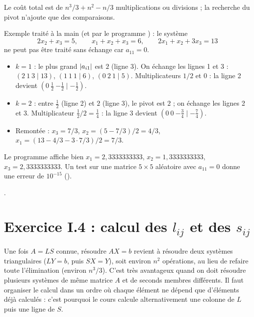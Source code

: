 Le coût total est de $n^3/3 + n^2 - n/3$ multiplications ou divisions
 ; la recherche du pivot n'ajoute que des comparaisons.

\Verif Exemple traité à la main (et par le programme ) :
le système
\[
  2x_2 + x_3 = 5, \qquad x_1 + x_2 + x_3 = 6, \qquad 2x_1 + x_2 + 3x_3 = 13
\]
ne peut pas être traité sans échange car $a_{11} = 0$.
\begin{itemize}
  \item $k = 1$ : le plus grand $\left|a_{i1}\right|$ est $2$ (ligne 3). On échange
        les lignes 1 et 3 : $(2\ 1\ 3 \mid 13)$, $(1\ 1\ 1 \mid 6)$,
        $(0\ 2\ 1 \mid 5)$. Multiplicateurs $1/2$ et $0$ : la ligne 2 devient
        $(0\ \tfrac12\ {-\tfrac12} \mid -\tfrac12)$.
  \item $k = 2$ : entre $\tfrac12$ (ligne 2) et $2$ (ligne 3), le pivot est
        $2$ ; on échange les lignes 2 et 3. Multiplicateur
        $\tfrac12/2 = \tfrac14$ : la ligne 3 devient
        $(0\ 0\ {-\tfrac34} \mid -\tfrac74)$.
  \item Remontée : $x_3 = 7/3$, $x_2 = (5 - 7/3)/2 = 4/3$,
        $x_1 = (13 - 4/3 - 3\cdot 7/3)/2 = 7/3$.
\end{itemize}
Le programme affiche bien $x_1 = 2{,}3333333333$, $x_2 = 1{,}3333333333$,
$x_3 = 2{,}3333333333$. Un test sur une matrice $5\times 5$ aléatoire avec
$a_{11} = 0$ donne une erreur de $10^{-15}$ ().

\Refs {}.

\section{\texorpdfstring{Exercice I.4 : calcul des $l_{ij}$ et des $s_{ij}$}{Exercice I.4 : calcul des lij et des sij}}


\Pourquoi Une fois $A = LS$ connue, résoudre $AX = b$ revient à résoudre deux
systèmes triangulaires ($LY = b$, puis $SX = Y$), soit environ $n^2$
opérations, au lieu de refaire toute l'élimination (environ $n^3/3$). C'est
très avantageux quand on doit résoudre plusieurs systèmes de même matrice $A$
et de seconds membres différents. Il faut organiser le calcul dans un ordre
où chaque élément ne dépend que d'éléments déjà calculés : c'est pourquoi le
cours calcule alternativement une colonne de $L$ puis une ligne de $S$.

